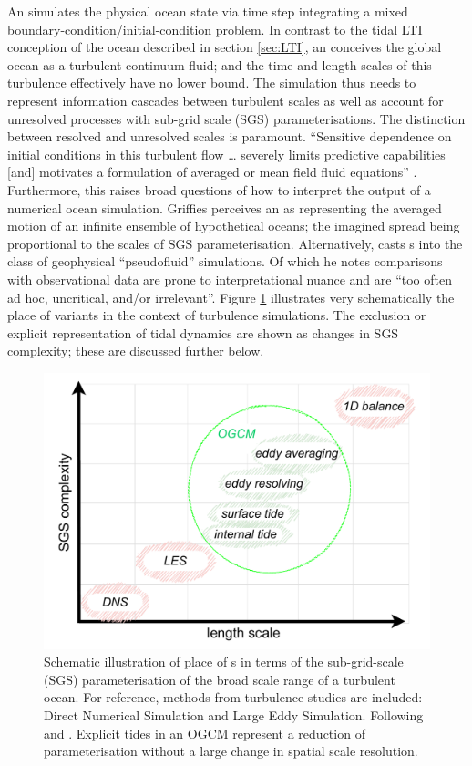 An \OGCM{} simulates the physical ocean state via time step integrating a mixed boundary-condition/initial-condition problem.
In contrast to the tidal LTI conception of the ocean described in section \ref{sec:LTI}, an \OGCM{} conceives the global ocean as a turbulent continuum fluid; and the time and length scales of this turbulence effectively have no lower bound. The simulation thus needs to represent information cascades between turbulent scales as well as account for unresolved processes with sub-grid scale (SGS) parameterisations.
The distinction between resolved and unresolved scales is paramount.  ``Sensitive dependence on initial conditions in this turbulent flow \dots{} severely limits predictive capabilities [and] motivates a formulation of averaged or mean field fluid equations'' \citep[Sec 2.5]{Griffies:2004vs}.
Furthermore, this raises broad questions of how to interpret the output of a numerical ocean simulation.
Griffies perceives an \OGCM{} as representing the averaged motion of an infinite ensemble of hypothetical oceans; the imagined spread being proportional to the scales of SGS parameterisation.
Alternatively, \citet{Stevens:2001kb} casts \OGCM{}s into the class of geophysical ``pseudofluid'' simulations. Of which he notes comparisons with observational data are prone to interpretational nuance and are ``too often ad hoc, uncritical, and/or irrelevant''\citep[pp 286]{Stevens:2001kb}. 
Figure \ref{fig:ogcmScales} illustrates very schematically the place of \OGCM{} variants in the context of turbulence simulations.   The exclusion or explicit representation of tidal dynamics are shown as changes in SGS complexity; these are discussed further below.
\begin{figure}[h]\centering
  \includegraphics[width=\figwidthBig]{figures/diagrams/ogcm_scales.pdf}
  \caption{Schematic illustration of place of \OGCM{}s in terms of the sub-grid-scale (SGS) parameterisation of the broad scale range of a turbulent ocean.  For reference, methods from turbulence studies are included: Direct Numerical Simulation and Large Eddy Simulation. Following \citep[fig 5.2]{Petersen:2012tr} and \citep{Stevens:2001kb}.  Explicit tides in an OGCM represent a reduction of parameterisation without a large change in spatial scale resolution.}
  \label{fig:ogcmScales}
\end{figure}
